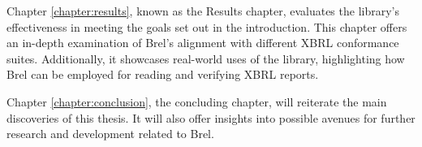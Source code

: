 Chapter \ref{chapter:results}, known as the Results chapter, 
evaluates the library's effectiveness in meeting the goals set out in the introduction. 
This chapter offers an in-depth examination of Brel's alignment with different XBRL conformance suites. 
Additionally, it showcases real-world uses of the library, 
highlighting how Brel can be employed for reading and verifying XBRL reports.

Chapter \ref{chapter:conclusion}, the concluding chapter,
will reiterate the main discoveries of this thesis.
It will also offer insights into possible avenues for further research and development related to Brel.